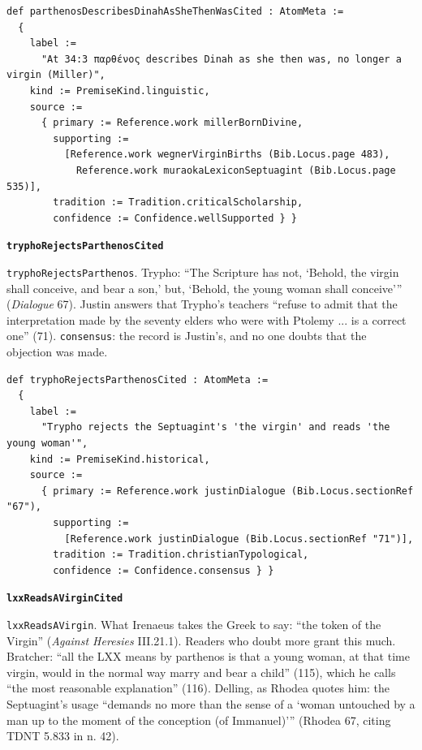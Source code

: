\documentclass[11pt]{article}
\begin{document}
{\small\begin{verbatim}
def parthenosDescribesDinahAsSheThenWasCited : AtomMeta :=
  {
    label :=
      "At 34:3 παρθένος describes Dinah as she then was, no longer a virgin (Miller)",
    kind := PremiseKind.linguistic,
    source :=
      { primary := Reference.work millerBornDivine,
        supporting :=
          [Reference.work wegnerVirginBirths (Bib.Locus.page 483),
            Reference.work muraokaLexiconSeptuagint (Bib.Locus.page 535)],
        tradition := Tradition.criticalScholarship,
        confidence := Confidence.wellSupported } }
\end{verbatim}}
\par\medskip\noindent\textbf{\texttt{trypho\allowbreak{}Rejects\allowbreak{}Parthenos\allowbreak{}Cited}}\par\nobreak\noindent
\texttt{trypho\allowbreak{}Rejects\allowbreak{}Parthenos}. Trypho: “The Scripture has not, ‘Behold, the virgin shall conceive, and bear a son,’ but, ‘Behold, the young woman shall conceive’” (\emph{Dialogue} 67). Justin answers that Trypho’s teachers “refuse to admit that the interpretation made by the seventy elders who were with Ptolemy ... is a correct one” (71). \texttt{consensus}: the record is Justin’s, and no one doubts that the objection was made.

{\small\begin{verbatim}
def tryphoRejectsParthenosCited : AtomMeta :=
  {
    label :=
      "Trypho rejects the Septuagint's 'the virgin' and reads 'the young woman'",
    kind := PremiseKind.historical,
    source :=
      { primary := Reference.work justinDialogue (Bib.Locus.sectionRef "67"),
        supporting :=
          [Reference.work justinDialogue (Bib.Locus.sectionRef "71")],
        tradition := Tradition.christianTypological,
        confidence := Confidence.consensus } }
\end{verbatim}}
\par\medskip\noindent\textbf{\texttt{lxx\allowbreak{}Reads\allowbreak{}AVirgin\allowbreak{}Cited}}\par\nobreak\noindent
\texttt{lxx\allowbreak{}Reads\allowbreak{}AVirgin}. What Irenaeus takes the Greek to say: “the token of the Virgin” (\emph{Against Heresies} III.21.1). Readers who doubt more grant this much. Bratcher: “all the LXX means by parthenos is that a young woman, at that time virgin, would in the normal way marry and bear a child” (115), which he calls “the most reasonable explanation” (116). Delling, as Rhodea quotes him: the Septuagint’s usage “demands no more than the sense of a ‘woman untouched by a man up to the moment of the conception (of Immanuel)’” (Rhodea 67, citing TDNT 5.833 in n. 42).
\end{document}
